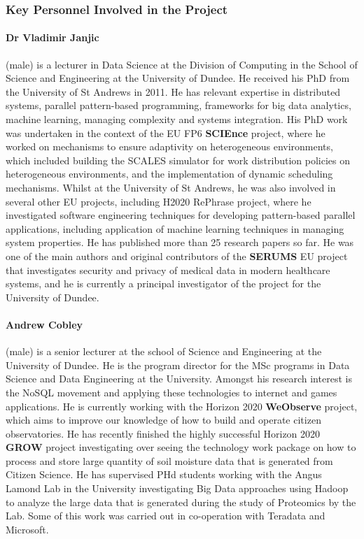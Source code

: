 \documentclass[a4paper,11pt]{article}
\begin{document}
\vspace{10pt}
\subsubsection*{Key Personnel Involved in the Project}

\paragraph{Dr Vladimir Janjic} (male) is a lecturer in Data Science at the Division of Computing in the School of Science and Engineering at the University of Dundee. He received his PhD from the University of St Andrews in 2011. He has relevant expertise in distributed systems, parallel pattern-based programming, frameworks for big data analytics, machine learning, managing complexity and systems integration. His PhD work was undertaken in the context of the EU FP6 \textbf{SCIEnce} project, where he worked on mechanisms to ensure adaptivity on heterogeneous environments, which included building the SCALES simulator for work distribution policies on heterogeneous environments, and the implementation of dynamic scheduling mechanisms. Whilst at the University of St Andrews, he was also involved in several other EU projects, including H2020 RePhrase project, where he investigated software engineering techniques for developing pattern-based parallel applications, including application of machine learning techniques in managing system properties. He has published more than 25 research papers so far. He was one of the main authors and original contributors of the \textbf{SERUMS} EU project that investigates security and privacy of medical data in modern healthcare systems, and he is currently a principal investigator of the project for the University of Dundee.

\paragraph{Andrew Cobley} (male) is a senior lecturer at the school of Science and Engineering at the University of Dundee.    He is the program director for the MSc programs in Data Science and Data Engineering at the University.   Amongst his research interest is the NoSQL movement and applying these technologies to internet and games applications. He is currently working with the Horizon 2020 \textbf{WeObserve} project, which aims to improve our knowledge of how to build and operate citizen observatories. He has recently finished the highly successful Horizon 2020 \textbf{GROW} project investigating over seeing the technology work package on how to process and store large quantity of  soil moisture data  that is generated from Citizen Science.  He has supervised PHd students working with the Angus Lamond Lab in the University investigating Big Data approaches using Hadoop to analyze the large data that is generated during the study of Proteomics by the Lab.  Some of this work was carried out in co-operation with Teradata and Microsoft.
\end{document}
